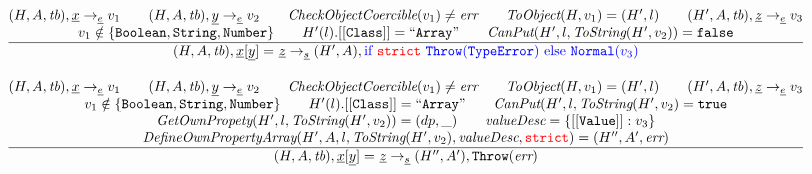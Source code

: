 \documentclass[a4paper, leqno]{amsart}
\newcommand{\rulesep}{\quad\quad}
\newcommand{\stmt}{s}
\newcommand{\expr}{e}
\newcommand{\ir}[1]{\ensuremath{\underline{#1}}}
\newcommand{\irid}{\ir{x}}
\newcommand{\reject}{\inblue\mbox{if \strict}\ {\tt Throw}(\te)\ \mbox{else}\ {\tt Normal}(v_3)}
\def\inred{\color{red}}
\def\inblue{\color{blue}}
\newcommand{\strict}{{\inred\tt strict}}
\newcommand{\false}{{\tt false}}
\newcommand{\true}{{\tt true}}
\newcommand{\tb}{\emph{tb}}
\newcommand{\err}{\emph{err}}
\newcommand{\te}{{\tt TypeError}}
\newcommand{\hf}[1]{\emph{#1}}
\newcommand{\state}{\ensuremath{(H,A,\tb)}}
\newcommand{\evale}{\ensuremath{(H,A,\tb)}}
\def\inred{\color{red}}
\def\inblue{\color{blue}}
\begin{document}
\[
\begin{array}{l@{~~}l@{~~}ll}


\frac{\begin{matrix}
\evale, \irid \rightarrow_{\ir\expr} v_1
\rulesep
\evale, \ir{y} \rightarrow_{\ir\expr} v_2
\rulesep
\hf{CheckObjectCoercible}(v_1) \not= \err
\rulesep
\hf{ToObject}(H, v_1) = (H',l)
\rulesep
(H', A, \tb), \ir{z} \rightarrow_{\ir\expr} v_3
\\
v_1 \notin \{{\tt Boolean, String, Number}\}
\rulesep
H'(l).[[{\tt Class}]] = {\tt``Array"}%
\rulesep
\hf{CanPut}(H', l, \hf{ToString}(H', v_2)) = \false
\end{matrix}}{\begin{matrix}
\state, \irid{\tt[}\ir{y}{\tt] =} \ \ir{z} \rightarrow_{\ir\stmt}
(H',A), \reject
\end{matrix}}
\\[2em]







\frac{\begin{matrix}
\evale, \irid \rightarrow_{\ir\expr} v_1
\rulesep
\evale, \ir{y} \rightarrow_{\ir\expr} v_2
\rulesep
\hf{CheckObjectCoercible}(v_1) \not= \err
\rulesep
\hf{ToObject}(H, v_1) = (H',l)
\rulesep
(H', A, \tb), \ir{z} \rightarrow_{\ir\expr}  v_3
\\
v_1 \notin \{{\tt Boolean, String, Number}\}
\rulesep
H'(l).[[{\tt Class}]] = {\tt``Array"}%
\rulesep
\hf{CanPut}(H', l, \hf{ToString}(H', v_2) = \true
\\
\hf{GetOwnPropety}(H', l, \hf{ToString}(H', v_2)) = (dp, \_)
\rulesep
\hf{valueDesc} = \{[[{\tt Value}]]:v_3\}
\\
\hf{DefineOwnPropertyArray}(H', A, l, \hf{ToString}(H', v_2), \hf{valueDesc}, \strict) = (H'', A', \err)
\end{matrix}}{\begin{matrix}
\state, \irid{\tt[}\ir{y}{\tt] =} \ \ir{z} \rightarrow_{\ir\stmt}
(H'',A'), {\tt Throw}(\err)
\end{matrix}}
\\[2em]



\end{array}\]
\end{document}
